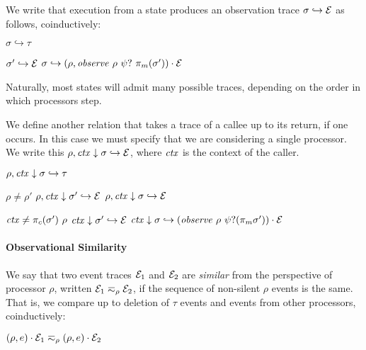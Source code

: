 \documentclass[10pt,conference]{ieeetran}%
\theoremstyle{definition}
\begin{document}
We write that execution from a state produces an observation trace \(\sigma \hookrightarrow \mathcal{E}\)
as follows, coinductively:

         {\(\sigma \hookrightarrow \tau\)}

            {\(\sigma' \hookrightarrow \mathcal{E}\)}
            {\(\sigma \hookrightarrow (\rho,\mathit{observe} ~ \rho ~ \psi? ~ \pi_m(\sigma')) \cdot \mathcal{E}\)}

Naturally, most states will admit many possible traces, depending on the order in which
processors step.

We define another relation that takes a trace of a callee up to its return, if one occurs.
In this case we must specify that we are considering a single processor.
We write this \(\rho,\mathit{ctx} \downarrow \sigma \hookrightarrow \mathcal{E}\), where \(\mathit{ctx}\)
is the context of the caller.

         {\(\rho, \mathit{ctx} \downarrow \sigma \hookrightarrow \tau\)}

              {\(\rho \not = \rho'\)}
              {\(\rho, \mathit{ctx} \downarrow \sigma' \hookrightarrow \mathcal{E}\)}
              {\(\rho, \mathit{ctx} \downarrow \sigma \hookrightarrow \mathcal{E}\)}

              {\(\mathit{ctx} \not = \pi_c(\sigma') ~ \rho\)}
              {\(\mathit{ctx} \downarrow \sigma' \hookrightarrow \mathcal{E}\)}
              {\(\mathit{ctx} \downarrow \sigma \hookrightarrow (\mathit{observe} ~ \rho ~ \psi? (\pi_m{\sigma'})) \cdot \mathcal{E}\)}

\paragraph*{Observational Similarity}

We say that two event traces $\mathcal{E}_1$ and $\mathcal{E}_2$ are {\em similar}
from the perspective of processor \(\rho\), written \(\mathcal{E}_1 \eqsim_\rho
\mathcal{E}_2\), if the sequence of non-silent \(\rho\) events is the same. That is, we
compare up to deletion of \(\tau\) events and events from other processors, coinductively:

\begin{minipage}{.4\columnwidth}
  \judgment{}{\(\obsT \eqsim_\rho \obsT\)}
\end{minipage}
\begin{minipage}{.4\columnwidth}
           {\((\rho, e) \cdot \mathcal{E}_1 \eqsim_\rho (\rho, e) \cdot \mathcal{E}_2\)}
\end{minipage}
\end{document}
